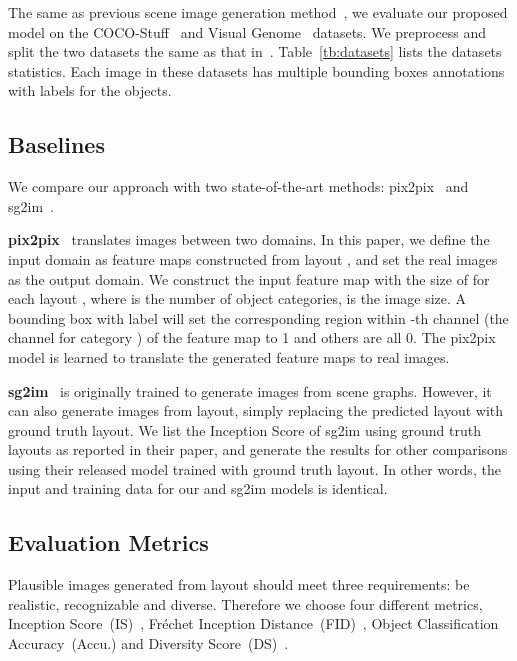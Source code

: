 \documentclass[10pt,twocolumn,letterpaper]{article}
\begin{document}
The same as previous scene image generation method~\cite{Johnson2018}, we evaluate our proposed model on the COCO-Stuff~\cite{caesar2016coco} and Visual Genome~\cite{krishna2017visual} datasets. We preprocess and split the two datasets the same as that in~\cite{Johnson2018}. Table~\ref{tb:datasets} lists the datasets statistics. Each image in these datasets has multiple bounding boxes annotations with labels for the objects.




\subsection{Baselines}
We compare our approach with two state-of-the-art methods: pix2pix~\cite{isola2017image} and sg2im~\cite{Johnson2018}.

\vspace{0.05in}
\noindent\textbf{pix2pix}~\cite{isola2017image} translates images between two domains. 
In this paper, we define the input domain as feature maps constructed from layout , and set the real images as the output domain.
We construct the input feature map with the size of  for each layout , where  is the number of object categories,  is the image size. 
A bounding box  with label  will set the corresponding region within -th channel (the channel for category ) of the feature map to 1 and others are all 0.
The pix2pix model is learned to translate the generated feature maps to real images.

\noindent\textbf{sg2im}~\cite{Johnson2018} is originally trained to generate images from scene graphs. 
However, it can also generate images from layout, simply replacing the predicted layout with ground truth layout. 
We list the Inception Score of sg2im using ground truth layouts as reported in their paper, and generate the results for other comparisons using their released model trained with ground truth layout. In other words, the input and training data for our and sg2im models is identical. 

\subsection{Evaluation Metrics}
Plausible images generated from layout should meet three requirements: be realistic, recognizable and diverse. Therefore we choose four different metrics, Inception Score~(IS)~\cite{salimans2016improved}, Fr\'echet Inception Distance~(FID)~\cite{Heusel2017}, Object Classification Accuracy~(Accu.) and Diversity Score~(DS)~\cite{zhang2018unreasonable}.
\end{document}
